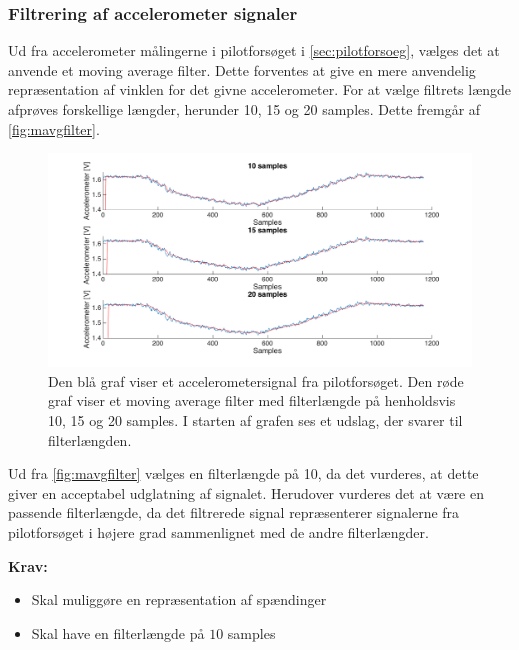 \subsubsection{Filtrering af accelerometer signaler} \label{sec:mavg_krav}
Ud fra accelerometer målingerne i pilotforsøget i \autoref{sec:pilotforsoeg}, vælges det at anvende et moving average filter. 
Dette forventes at give en mere anvendelig repræsentation af vinklen for det givne accelerometer. 
For at vælge filtrets længde afprøves forskellige længder, herunder 10, 15 og 20 samples. Dette fremgår af \autoref{fig:mavgfilter}.


\begin{figure} [H]
\centering
\includegraphics[width=1\textwidth]{figures/problemloesning/mavgfilter_matlab} 
\caption{Den blå graf viser et accelerometersignal fra pilotforsøget. Den røde graf viser et moving average filter med filterlængde på henholdsvis 10, 15 og 20 samples. I starten af grafen ses et udslag, der  svarer til filterlængden.}
\label{fig:mavgfilter}
\end{figure}

\noindent
Ud fra \autoref{fig:mavgfilter} vælges en filterlængde på 10, da det vurderes, at dette giver en acceptabel udglatning af signalet.
Herudover vurderes det at være en passende filterlængde, da det filtrerede signal repræsenterer signalerne fra pilotforsøget i højere grad sammenlignet med de andre filterlængder. 


\vspace{3mm}
\textbf{Krav:}
\begin{itemize}
\item Skal muliggøre en repræsentation af spændinger 
\item Skal have en filterlængde på $10$ samples
\end{itemize}
